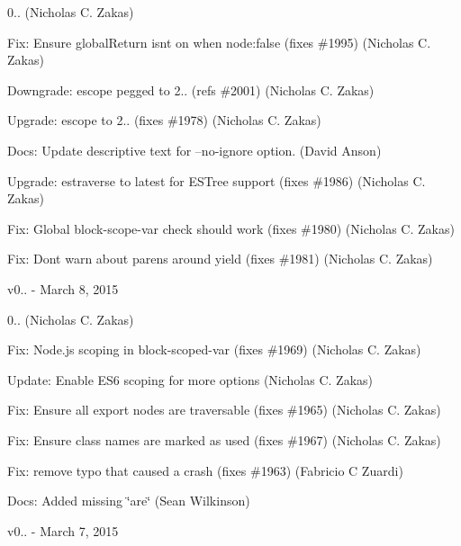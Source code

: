 \begin{DoxyItemize}
\item 0.. (Nicholas C. Zakas)
\item Fix\+: Ensure global\+Return isn\textquotesingle{}t on when node\+:false (fixes \#1995) (Nicholas C. Zakas)
\item Downgrade\+: escope pegged to 2.. (refs \#2001) (Nicholas C. Zakas)
\item Upgrade\+: escope to 2.. (fixes \#1978) (Nicholas C. Zakas)
\item Docs\+: Update descriptive text for --no-\/ignore option. (David Anson)
\item Upgrade\+: estraverse to latest for E\+S\+Tree support (fixes \#1986) (Nicholas C. Zakas)
\item Fix\+: Global block-\/scope-\/var check should work (fixes \#1980) (Nicholas C. Zakas)
\item Fix\+: Don\textquotesingle{}t warn about parens around yield (fixes \#1981) (Nicholas C. Zakas)
\end{DoxyItemize}

v0.. -\/ March 8, 2015


\begin{DoxyItemize}
\item 0.. (Nicholas C. Zakas)
\item Fix\+: Node.\+js scoping in block-\/scoped-\/var (fixes \#1969) (Nicholas C. Zakas)
\item Update\+: Enable E\+S6 scoping for more options (Nicholas C. Zakas)
\item Fix\+: Ensure all export nodes are traversable (fixes \#1965) (Nicholas C. Zakas)
\item Fix\+: Ensure class names are marked as used (fixes \#1967) (Nicholas C. Zakas)
\item Fix\+: remove typo that caused a crash (fixes \#1963) (Fabricio C Zuardi)
\item Docs\+: Added missing \char`\"{}are\char`\"{} (Sean Wilkinson)
\end{DoxyItemize}

v0.. -\/ March 7, 2015



